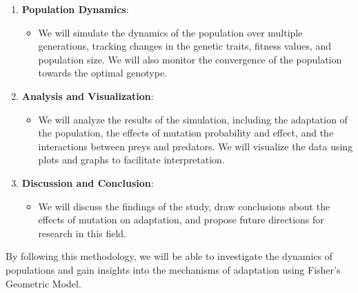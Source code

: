 \documentclass{article}
\begin{document}
\begin{enumerate}
    \item \textbf{Population Dynamics}:
    \begin{itemize}
        \item We will simulate the dynamics of the population over multiple generations, tracking changes in the genetic traits, fitness values, and population size. We will also monitor the convergence of the population towards the optimal genotype.
    \end{itemize}
    
    \item \textbf{Analysis and Visualization}:
    \begin{itemize}
        \item We will analyze the results of the simulation, including the adaptation of the population, the effects of mutation probability and effect, and the interactions between preys and predators. We will visualize the data using plots and graphs to facilitate interpretation.
    \end{itemize}
    
    \item \textbf{Discussion and Conclusion}:
    \begin{itemize}
        \item We will discuss the findings of the study, draw conclusions about the effects of mutation on adaptation, and propose future directions for research in this field.
    \end{itemize}
\end{enumerate}

By following this methodology, we will be able to investigate the dynamics of populations and gain insights into the mechanisms of adaptation using Fisher's Geometric Model.
\end{document}
